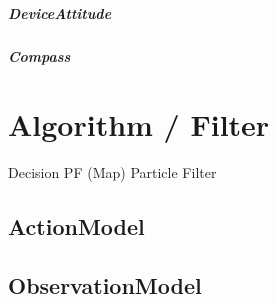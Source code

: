 \paragraph{DeviceAttitude}

\paragraph{Compass}


\chapter{Algorithm / Filter}
Decision PF (Map)
Particle Filter
\section{ActionModel}
\section{ObservationModel}

